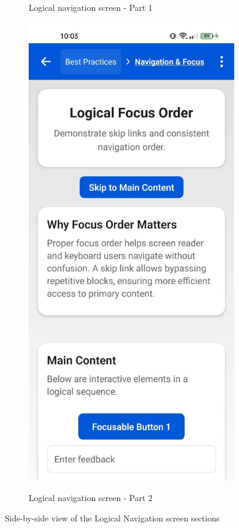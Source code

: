 \begin{figure}[ht]
\begin{subfigure}[b]{0.48\textwidth}
        \caption{Logical navigation screen - Part 1}
        \label{fig:logical-left}
    \end{subfigure}
    \hfill
    \begin{subfigure}[b]{0.48\textwidth}
        \centering
        \includegraphics[width=\linewidth, alt={Second part of the Logical Navigation Screen}]{img/logical2.jpg}
        \caption{Logical navigation screen - Part 2}
        \label{fig:logical-right}
    \end{subfigure}
    \caption{Side-by-side view of the Logical Navigation screen sections}
    \label{fig:logical_screens_sidebyside}
\end{figure}

